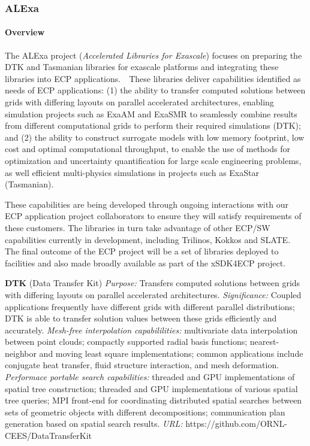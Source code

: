 
\subsubsection{ ALExa} 


\paragraph{Overview} 

The ALExa project ({\sl Accelerated Libraries for
Exascale})
focuses on preparing the DTK and Tasmanian libraries for
exascale platforms and integrating these libraries into ECP
applications.  These libraries deliver capabilities
identified as needs of ECP applications: (1) the ability to
transfer computed solutions between grids with differing
layouts on parallel accelerated architectures,
enabling simulation projects such as ExaAM and ExaSMR to
seamlessly combine results from different computational
grids to perform their required simulations (DTK); and (2) the
ability to construct surrogate models with low memory
footprint, low cost and optimal computational throughput, to
enable the use of methods for optimization and uncertainty
quantification for large scale engineering problems, as well
efficient multi-physics simulations in projects such as
ExaStar (Tasmanian).

These capabilities
are being developed through ongoing interactions with our
ECP application project collaborators to ensure they will
satisfy requirements of these customers.  The libraries in
turn take advantage of other ECP/SW capabilities currently in
development, including Trilinos, Kokkos and SLATE.  The
final outcome of the ECP project will be a set of
libraries deployed to facilities
and also made broadly available as part of the xSDK4ECP
project.

{\bf DTK} (Data Transfer Kit)
{\it Purpose:}
Transfers computed solutions between grids with differing
layouts on parallel accelerated architectures.
{\it Significance:} Coupled applications frequently have
different grids with different parallel distributions; DTK
is able to transfer solution values between these grids
efficiently and accurately.
{\it Mesh-free interpolation capabililities:}
multivariate data interpolation between point clouds;
compactly supported radial basis functions;
nearest-neighbor and moving least square implementations;
common applications include conjugate heat transfer,
fluid structure interaction, and mesh deformation.
{\it Performace portable search capabilities:}
threaded and GPU implementations of spatial tree
construction;
threaded and GPU implementations of various spatial tree
queries;
MPI front-end for coordinating distributed spatial searches
between sets of geometric objects with different
decompositions;
communication plan generation based on spatial search
results.
{\it URL:}
https://github.com/ORNL-CEES/DataTransferKit


